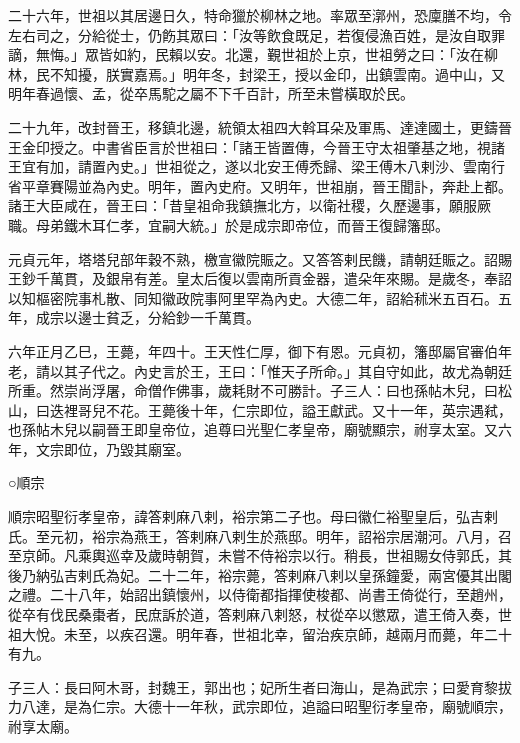 \begin{pinyinscope}
 二十六年，世祖以其居邊日久，特命獵於柳林之地。率眾至漷州，恐廩膳不均，令左右司之，分給從士，仍飭其眾曰：「汝等飲食既足，若復侵漁百姓，是汝自取罪謫，無悔。」眾皆如約，民賴以安。北還，覲世祖於上京，世祖勞之曰：「汝在柳林，民不知擾，朕實嘉焉。」明年冬，封梁王，授以金印，出鎮雲南。過中山，又明年春過懷、孟，從卒馬駝之屬不下千百計，所至未嘗橫取於民。



 二十九年，改封晉王，移鎮北邊，統領太祖四大斡耳朵及軍馬、達達國土，更鑄晉王金印授之。中書省臣言於世祖曰：「諸王皆置傳，今晉王守太祖肇基之地，視諸王宜有加，請置內史。」世祖從之，遂以北安王傅禿歸、梁王傅木八剌沙、雲南行省平章賽陽並為內史。明年，置內史府。又明年，世祖崩，晉王聞訃，奔赴上都。諸王大臣咸在，晉王曰：「昔皇祖命我鎮撫北方，以衛社稷，久歷邊事，願服厥職。母弟鐵木耳仁孝，宜嗣大統。」於是成宗即帝位，而晉王復歸籓邸。



 元貞元年，塔塔兒部年穀不熟，檄宣徽院賑之。又答答剌民饑，請朝廷賑之。詔賜王鈔千萬貫，及銀帛有差。皇太后復以雲南所貢金器，遣朵年來賜。是歲冬，奉詔以知樞密院事札散、同知徽政院事阿里罕為內史。大德二年，詔給秫米五百石。五年，成宗以邊士貧乏，分給鈔一千萬貫。



 六年正月乙巳，王薨，年四十。王天性仁厚，御下有恩。元貞初，籓邸屬官審伯年老，請以其子代之。內史言於王，王曰：「惟天子所命。」其自守如此，故尤為朝廷所重。然崇尚浮屠，命僧作佛事，歲耗財不可勝計。子三人：曰也孫帖木兒，曰松山，曰迭裡哥兒不花。王薨後十年，仁宗即位，謚王獻武。又十一年，英宗遇弒，也孫帖木兒以嗣晉王即皇帝位，追尊曰光聖仁孝皇帝，廟號顯宗，祔享太室。又六年，文宗即位，乃毀其廟室。



 ○順宗



 順宗昭聖衍孝皇帝，諱答剌麻八剌，裕宗第二子也。母曰徽仁裕聖皇后，弘吉剌氏。至元初，裕宗為燕王，答剌麻八剌生於燕邸。明年，詔裕宗居潮河。八月，召至京師。凡乘輿巡幸及歲時朝賀，未嘗不侍裕宗以行。稍長，世祖賜女侍郭氏，其後乃納弘吉剌氏為妃。二十二年，裕宗薨，答剌麻八剌以皇孫鐘愛，兩宮優其出閣之禮。二十八年，始詔出鎮懷州，以侍衛都指揮使梭都、尚書王倚從行，至趙州，從卒有伐民桑棗者，民庶訴於道，答剌麻八剌怒，杖從卒以懲眾，遣王倚入奏，世祖大悅。未至，以疾召還。明年春，世祖北幸，留治疾京師，越兩月而薨，年二十有九。



 子三人：長曰阿木哥，封魏王，郭出也；妃所生者曰海山，是為武宗；曰愛育黎拔力八達，是為仁宗。大德十一年秋，武宗即位，追謚曰昭聖衍孝皇帝，廟號順宗，祔享太廟。



\end{pinyinscope}
